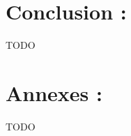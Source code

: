 \documentclass[12pt, a4paper]{article}
\begin{document}

\clearpage

\section{Conclusion :}
TODO



\section{Annexes :}
TODO
\end{document}
